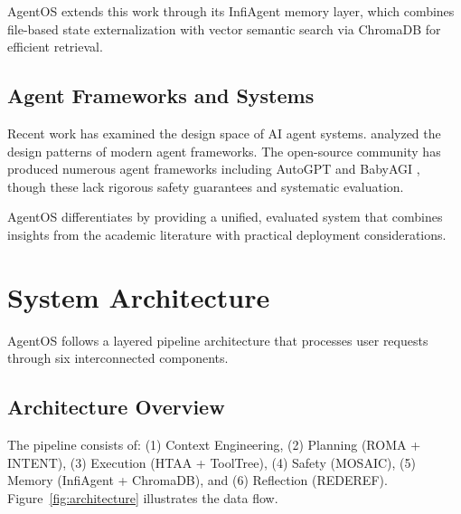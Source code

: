 \documentclass[11pt,a4paper]{article}
\begin{document}
AgentOS extends this work through its InfiAgent memory layer, which combines file-based state externalization with vector semantic search via ChromaDB for efficient retrieval.

\subsection{Agent Frameworks and Systems}

Recent work has examined the design space of AI agent systems. \citet{liu2026claudecode} analyzed the design patterns of modern agent frameworks. The open-source community has produced numerous agent frameworks including AutoGPT \citep{autogpt2023} and BabyAGI \citep{babyagi2023}, though these lack rigorous safety guarantees and systematic evaluation.

AgentOS differentiates by providing a unified, evaluated system that combines insights from the academic literature with practical deployment considerations.

\section{System Architecture}

AgentOS follows a layered pipeline architecture that processes user requests through six interconnected components.

\subsection{Architecture Overview}

The pipeline consists of: (1) Context Engineering, (2) Planning (ROMA + INTENT), (3) Execution (HTAA + ToolTree), (4) Safety (MOSAIC), (5) Memory (InfiAgent + ChromaDB), and (6) Reflection (REDEREF). Figure~\ref{fig:architecture} illustrates the data flow.
\end{document}
